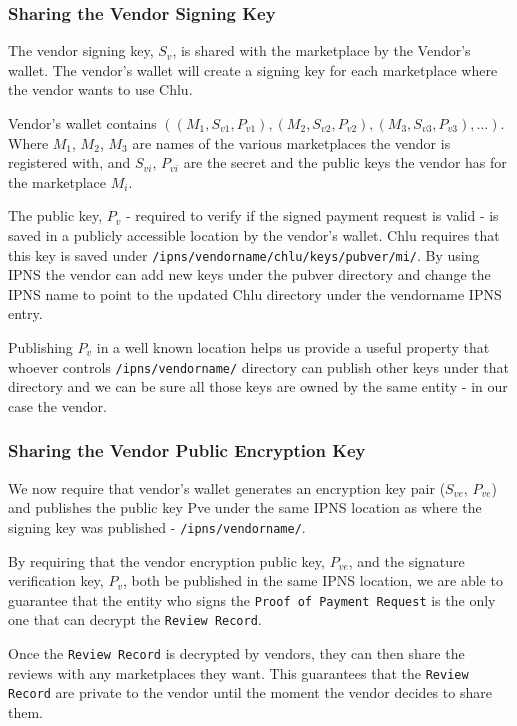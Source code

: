 \documentclass[a4paper]{article}
\begin{document}
\subsubsection{Sharing the Vendor Signing Key}

The vendor signing key, $S_v$, is shared with the marketplace by the
Vendor's wallet. The vendor's wallet will create a signing key for
each marketplace where the vendor wants to use Chlu.

Vendor's wallet contains $((M_1, S_{v1}, P_{v1}), (M_2, S_{v2},
P_{v2}), (M_3,S_{v3},P_{v3}), ...)$. Where $M_1$, $M_2$, $M_3$ are
names of the various marketplaces the vendor is registered with, and
$S_{vi}$, $P_{vi}$ are the secret and the public keys the vendor has
for the marketplace $M_i$.

The public key, $P_v$ - required to verify if the signed payment
request is valid - is saved in a publicly accessible location by the
vendor's wallet. Chlu requires that this key is saved under
\texttt{/ipns/vendorname/chlu/keys/pubver/mi/}. By using IPNS the vendor
can add new keys under the pubver directory and change the IPNS name
to point to the updated Chlu directory under the vendorname IPNS
entry.

Publishing $P_v$ in a well known location helps us provide a useful
property that whoever controls \texttt{/ipns/vendorname/} directory can
publish other keys under that directory and we can be sure all those
keys are owned by the same entity - in our case the vendor.

\subsubsection{Sharing the Vendor Public Encryption Key}

We now require that vendor's wallet generates an encryption key pair
($S_{ve}$, $P_{ve}$) and publishes the public key Pve under the same
IPNS location as where the signing key was published -
\texttt{/ipns/vendorname/}.

By requiring that the vendor encryption public key, $P_{ve}$, and the
signature verification key, $P_v$, both be published in the same IPNS
location, we are able to guarantee that the entity who signs the
\texttt{Proof of Payment Request} is the only one that can decrypt the
\texttt{Review Record}.

Once the \texttt{Review Record} is decrypted by vendors, they can then
share the reviews with any marketplaces they want. This guarantees
that the \texttt{Review Record} are private to the vendor until the
moment the vendor decides to share them.
\end{document}
